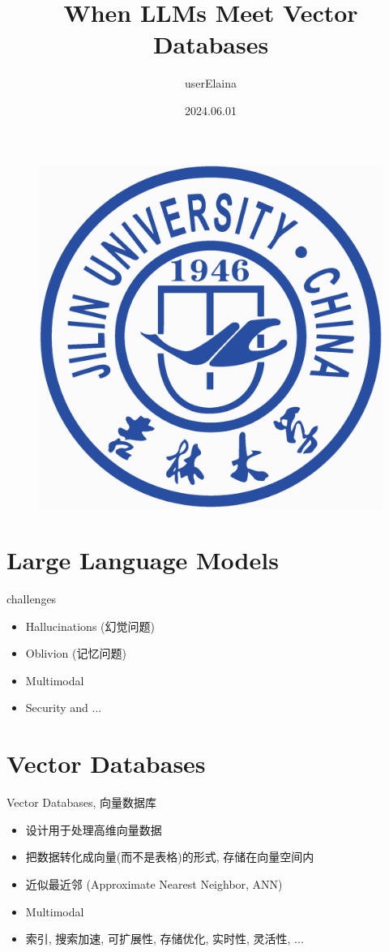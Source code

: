 \documentclass{beamer}
\author{userElaina}
\title{When LLMs Meet Vector Databases}
\institute{School of AI}
\date{2024.06.01}
\begin{document}
\kaishu
\begin{frame}
    \titlepage
    \begin{figure}[htpb]
        \begin{center}
            \includegraphics[width=0.15\linewidth]{pic/Jilin_University_Logo.eps}
        \end{center}
    \end{figure}
\end{frame}

\begin{frame}
\tableofcontents[sectionstyle=show,subsectionstyle=show/shaded/hide,subsubsectionstyle=show/shaded/hide]
\end{frame}

\section{Large Language Models}

\begin{frame}{challenges}
    \begin{itemize}
        \item Hallucinations (幻觉问题)
        \item Oblivion (记忆问题)
        \item Multimodal
        \item Security and ...
    \end{itemize}
\end{frame}

\section{Vector Databases}

\begin{frame}{Vector Databases, 向量数据库}
    \begin{itemize}
        \item 设计用于处理高维向量数据
        \item 把数据转化成向量(而不是表格)的形式, 存储在向量空间内
        \item 近似最近邻 (Approximate Nearest Neighbor, ANN)
        \item Multimodal
        \item 索引, 搜索加速, 可扩展性, 存储优化, 实时性, 灵活性, ...
    \end{itemize}
\end{frame}
\end{document}
